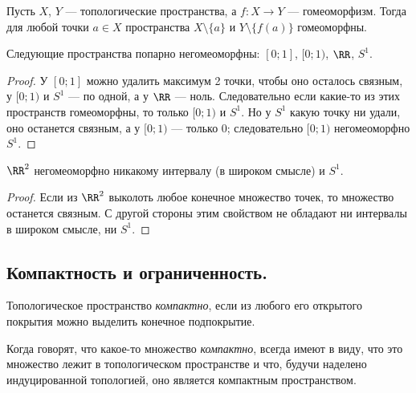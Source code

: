 \documentclass[12pt,a4paper]{article}
\begin{document}
    \begin{lemma}
        Пусть $X$, $Y$ --- топологические пространства, а $f: X \to Y$ --- гомеоморфизм. Тогда для любой точки $a \in X$ пространства $X \setminus \{a\}$ и $Y \setminus \{f(a)\}$ гомеоморфны.
    \end{lemma}

    \begin{theorem}
        Следующие пространства попарно негомеоморфны: $[0; 1]$, $[0; 1)$, $\RR$, $S^1$.
    \end{theorem}

    \begin{proof}
        У $[0; 1]$ можно удалить максимум 2 точки, чтобы оно осталось связным, у $[0; 1)$ и $S^1$ --- по одной, а у $\RR$ --- ноль. Следовательно если какие-то из этих пространств гомеоморфны, то только $[0; 1)$ и $S^1$. Но у $S^1$ какую точку ни удали, оно останется связным, а у $[0; 1)$ --- только $0$; следовательно $[0; 1)$ негомеоморфно $S^1$.
    \end{proof}

    \begin{theorem}
        $\RR^2$ негомеоморфно никакому интервалу (в широком смысле) и $S^1$.
    \end{theorem}

    \begin{proof}
        Если из $\RR^2$ выколоть любое конечное множество точек, то множество останется связным. С другой стороны этим свойством не обладают ни интервалы в широком смысле, ни $S^1$.
    \end{proof}

    \subsection{Компактность и ограниченность.}

    \begin{definition}
        Топологическое пространство \emph{компактно}, если из любого его открытого покрытия можно выделить конечное подпокрытие.
    \end{definition}

    \begin{remark*}
        Когда говорят, что какое-то множество \emph{компактно}, всегда имеют в виду, что это множество лежит в топологическом пространстве и что, будучи наделено индуцированной топологией, оно является компактным пространством.
    \end{remark*}
\end{document}

